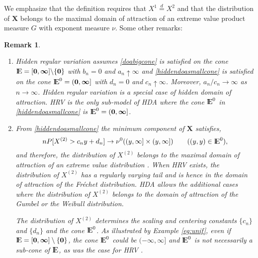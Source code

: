\documentclass[11 pt]{amsart}
\newtheorem{rem}[thm]{Remark}
\numberwithin{equation}{section}
\begin{document}
We emphasize that the definition requires that $X^1
\stackrel{d}{=}X^2$ and  that the distribution
  of ${\boldsymbol X}$ belongs to the maximal domain of 
  attraction of an extreme value product measure  $G$ {with exponent
  measure $\nu$}. Some other remarks:
\begin{rem}\label{rem:hdoa}
{\rm{
\begin{enumerate}
\item  Hidden regular variation assumes
  \eqref{doabigcone} is satisfied 
{on the cone ${\mathop{\rm I\kern -0.20em E}\nolimits} = {[{\boldsymbol 0}, {\boldsymbol \infty}]} \backslash \{ {\boldsymbol 0}\}$}
with $b_n = 0$ and $a_n \uparrow
  \infty$ 
  and \eqref{hiddendoasmallcone} is satisfied 
{on the cone ${\mathop{\rm I\kern -0.20em E}\nolimits}^0 = ({\boldsymbol 0}, {\boldsymbol \infty}]$}
with $d_n = 0$ and $c_n
  \uparrow \infty$.  Moreover,
  $a_n/c_n \to \infty $ as $n \to \infty$.  Hidden regular
  variation  is a special case
  of hidden domain of attraction. HRV is the only sub-model of HDA where  the cone ${\mathop{\rm I\kern -0.20em E}\nolimits}^0$ in
  \eqref{hiddendoasmallcone} is ${\mathop{\rm I\kern -0.20em E}\nolimits}^0 = ({\boldsymbol 0}, {\boldsymbol \infty}]$.  

\item \label{rem3:hdoa} From \eqref{hiddendoasmallcone} the minimum
  component of ${\boldsymbol X}$ satisfies,
\begin{equation}\label{eqn:mindoa}
nP[ X^{(2)} > c_n y + d_n ] \rightarrow \nu^0((y, \infty] \times (y,
\infty]) \qquad ((y, y) \in {\mathop{\rm I\kern -0.20em E}\nolimits}^0),
\end{equation}
and therefore, the distribution of $X^{(2)}$ belongs to the maximal domain
of attraction of an extreme value distribution \citep[page
4]{dehaan:ferreira:2006}. When HRV exists, the distribution of
$X^{(2)}$ has a regularly varying tail and is hence in 
the domain of attraction of the Fr\'{e}chet distribution. HDA 
{allows} the additional cases where the distribution of
$X^{(2)}$ belongs to the domain of attraction of the Gumbel or the
 Weibull distribution. 

The distribution of $X^{(2)}$ determines the scaling and centering
constants $\{c_n\}$ and $\{d_n\}$ and the cone ${\mathop{\rm I\kern -0.20em E}\nolimits}^0$. As illustrated
by  Example \ref{eg:unif}, even
if ${\mathop{\rm I\kern -0.20em E}\nolimits} = [{\boldsymbol 0}, {\boldsymbol \infty}] \setminus \{ {\boldsymbol 0} \}$, the cone ${\mathop{\rm I\kern -0.20em E}\nolimits}^0$ could be
$(-{\boldsymbol \infty}, {\boldsymbol \infty}]$ {and} ${\mathop{\rm I\kern -0.20em E}\nolimits}^0$ is not necessarily a sub-cone of
${\mathop{\rm I\kern -0.20em E}\nolimits}$, as was the case {for} HRV \citep{resnick:2002a}. 


\end{enumerate}}}
\end{rem}
\end{document}
